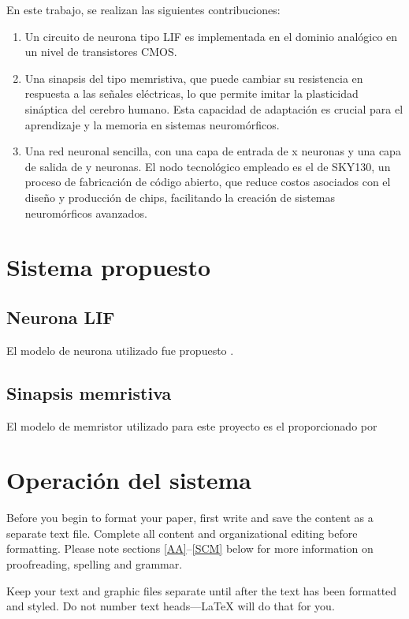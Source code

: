\documentclass[conference]{IEEEtran}
\begin{document}
En este trabajo, se realizan las siguientes contribuciones:

\begin{enumerate}
    \item Un circuito de neurona tipo LIF es implementada en el dominio analógico en un nivel de transistores CMOS. 
    \item Una sinapsis del tipo memristiva, que puede cambiar su resistencia en respuesta a las señales eléctricas, lo que permite imitar la plasticidad sináptica del cerebro humano. Esta capacidad de adaptación es crucial para el aprendizaje y la memoria en sistemas neuromórficos.
    \item Una red neuronal sencilla, con una capa de entrada de x neuronas y una capa de salida de y neuronas. El nodo tecnológico empleado es el de SKY130, un proceso de fabricación de código abierto, que reduce costos asociados con el diseño y producción de chips, facilitando la creación de sistemas neuromórficos avanzados.
\end{enumerate}

\section{Sistema propuesto}

\subsection{Neurona LIF}
El modelo de neurona utilizado fue propuesto \cite{Shamsi_2018}.

\subsection{Sinapsis memristiva}
El modelo de memristor utilizado para este proyecto es el proporcionado por 

\section{Operación del sistema}
Before you begin to format your paper, first write and save the content as a 
separate text file. Complete all content and organizational editing before 
formatting. Please note sections \ref{AA}--\ref{SCM} below for more information on 
proofreading, spelling and grammar.

Keep your text and graphic files separate until after the text has been 
formatted and styled. Do not number text heads---{\LaTeX} will do that 
for you.
\end{document}
